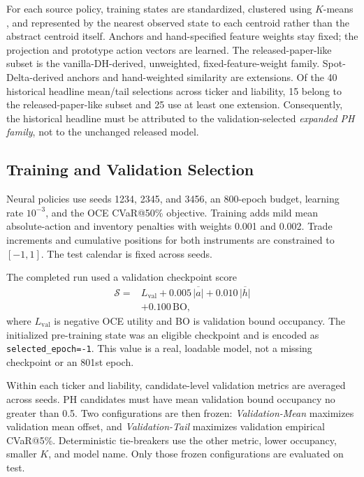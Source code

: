 \documentclass[conference]{IEEEtran}
\begin{document}
For each source policy, training states are standardized, clustered using
$K$-means \cite{macqueen1967}, and represented by the nearest observed state
to each centroid rather than the abstract centroid itself. Anchors and
hand-specified feature weights stay fixed; the projection and prototype action
vectors are learned. The released-paper-like subset is the vanilla-DH-derived,
unweighted, fixed-feature-weight family. Spot-Delta-derived anchors and
hand-weighted similarity are extensions. Of the 40 historical headline
mean/tail selections across ticker and liability, 15 belong to the
released-paper-like subset and 25 use at least one extension. Consequently, the
historical headline must be attributed to the validation-selected
\emph{expanded PH family}, not to the unchanged released model.

\subsection{Training and Validation Selection}

Neural policies use seeds 1234, 2345, and 3456, an 800-epoch budget, learning
rate $10^{-3}$, and the OCE CVaR@50\% objective. Training adds mild mean
absolute-action and inventory penalties with weights 0.001 and 0.002. Trade
increments and cumulative positions for both instruments are constrained to
$[-1,1]$. The test calendar is fixed across seeds.

The completed run used a validation checkpoint score
\begin{equation}
\begin{split}
\mathcal S={}&L_{\mathrm{val}}+0.005\,\overline{|a|}
+0.010\,\overline{|h|}\\
&+0.100\,\mathrm{BO},
\end{split}
\label{eq:executed-selector}
\end{equation}
where $L_{\mathrm{val}}$ is negative OCE utility and BO is validation bound
occupancy. The initialized pre-training state was an eligible checkpoint and is
encoded as \texttt{selected\_epoch=-1}. This value is a real, loadable model,
not a missing checkpoint or an 801st epoch.

Within each ticker and liability, candidate-level validation metrics are
averaged across seeds. PH candidates must have mean validation bound occupancy
no greater than 0.5. Two configurations are then frozen: \emph{Validation-Mean}
maximizes validation mean offset, and \emph{Validation-Tail} maximizes
validation empirical CVaR@5\%. Deterministic tie-breakers use the other metric,
lower occupancy, smaller $K$, and model name. Only those frozen configurations
are evaluated on test.
\end{document}
